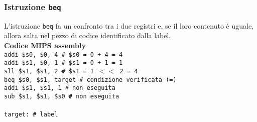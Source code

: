 \documentclass[../main.tex]{subfiles}
\begin{document}
\subsubsection{Istruzione \texttt{beq}}
L'istruzione \texttt{beq} fa un confronto tra i due registri e, se il loro contenuto
è uguale, allora salta nel pezzo di codice identificato dalla label.
\\[2mm]
\textbf{Codice MIPS assembly} \\
\texttt{addi \$s0, \$0, 4 \hspace*{0cm} \hspace*{0cm} \hspace*{0cm} \hspace*{0cm} \hspace*{0cm} \hspace*{0cm} \# \$s0 = 0 + 4 = 4} \\
\texttt{addi \$s1, \$0, 1 \hspace*{0cm} \hspace*{0cm} \hspace*{0cm} \hspace*{0cm} \hspace*{0cm} \hspace*{0cm} \# \$s1 = 0 + 1 = 1} \\
\texttt{sll \$s1, \$s1, 2 \hspace*{0cm} \hspace*{0cm} \hspace*{0cm} \hspace*{0cm} \hspace*{0cm} \hspace*{0cm} \# \$s1 = 1 $<<$ 2 = 4} \\
\texttt{beq \$s0, \$s1, target \hspace*{0cm} \# condizione verificata (=)} \\
\texttt{addi \$s1, \$s1, 1 \hspace*{0cm} \hspace*{0cm} \hspace*{0cm} \hspace*{0cm} \hspace*{0cm} \# non eseguita} \\
\texttt{sub \$s1, \$s1, \$s0 \hspace*{0cm} \hspace*{0cm} \hspace*{0cm} \hspace*{0cm} \# non eseguita} \\
\\
\texttt{target: \hspace*{0cm} \hspace*{0cm} \hspace*{0cm} \hspace*{0cm} \hspace*{0cm} \hspace*{0cm} \hspace*{0cm} \hspace*{0cm} \hspace*{0cm} \hspace*{0cm} \hspace*{0cm} \hspace*{0cm} \hspace*{0cm} \# label} \\
\end{document}
